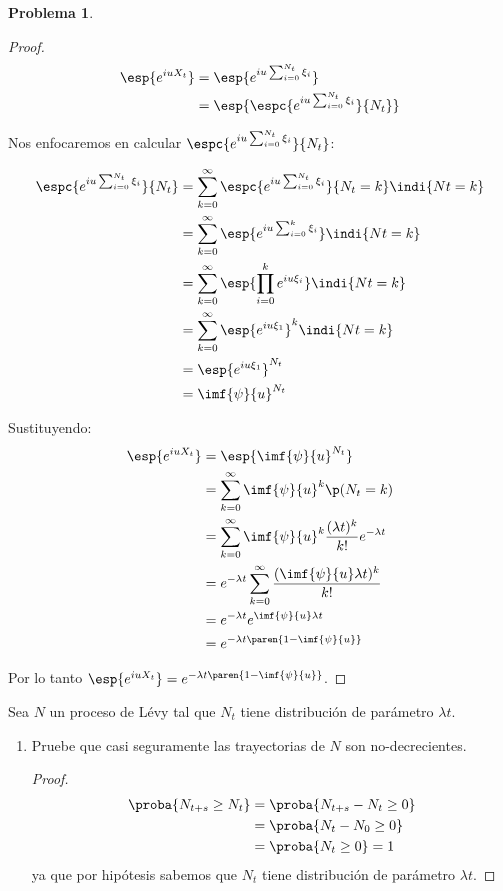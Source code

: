 \documentclass[a5paper,oneside]{amsart}
\theoremstyle{plain}
\theoremstyle{definition}
\newtheorem{problema}{Problema}
\begin{document}
\begin{problema}
\begin{proof}

\begin{align}
\esp{e^{iu X_t}}&=\esp{e^{iu \sum_{i=0}^{N_t}\xi_i}}\notag \\
&=\esp{\espc{e^{iu \sum_{i=0}^{N_t}\xi_i}}{N_t}}\notag
\end{align}

Nos enfocaremos en calcular $\espc{e^{iu \sum_{i=0}^{N_t}\xi_i}}{N_t}$:

\begin{align}
\espc{e^{iu \sum_{i=0}^{N_t}\xi_i}}{N_t}&=\sum_{k=0}^{\infty}\espc{e^{iu \sum_{i=0}^{N_t}\xi_i}}{N_t=k} \indi{Nt=k} \notag \\
&=\sum_{k=0}^{\infty}\esp{e^{iu \sum_{i=0}^{k}\xi_i}}\indi{Nt=k} \notag \\
&=\sum_{k=0}^{\infty}\esp{\prod_{i=0}^ke^{iu \xi_i}}\indi{Nt=k}\notag \\
&=\sum_{k=0}^{\infty}\esp{e^{iu \xi_1}}^k\indi{Nt=k} \notag  \\
&=\esp{e^{iu \xi_1}}^{N_t}\notag \\
&=\imf{\psi}{u}^{N_t}\notag
\end{align}

Sustituyendo:
\begin{align}
\esp{e^{iu X_t}} &=\esp{\imf{\psi}{u}^{N_t}}\notag \\
&=\sum_{k=0}^{\infty}\imf{\psi}{u}^k\p(N_t=k)\notag \\
&=\sum_{k=0}^{\infty}\imf{\psi}{u}^k\frac{(\lambda t)^{k}}{k!}e^{-\lambda t}\notag \\
&=e^{-\lambda t}\sum_{k=0}^{\infty}\frac{(\imf{\psi}{u} \lambda t)^{k}}{k!}\notag \\
&=e^{-\lambda t}e^{\imf{\psi}{u} \lambda t}\notag \\
&=e^{-\lambda t\paren{1-\imf{\psi}{u}}}\notag
\end{align}

Por lo  tanto $\esp{e^{iu X_t}}=e^{-\lambda t\paren{1-\imf{\psi}{u}}}$.
\end{proof}



Sea $N$ un proceso de L\'evy tal que $N_t$ tiene distribuci\'on de par\'ametro $\lambda t$. 
\begin{enumerate}
\item Pruebe que casi seguramente las trayectorias de $N$ son no-decrecientes.
\begin{proof}


\begin{align}
\proba{N_{t+s}\geq N_t}&=\proba{N_{t+s}-N_t\geq 0}\notag \\
&=\proba{N_{t}-N_0\geq 0}\notag \\
&=\proba{N_t\geq 0}=1 \notag
\end{align}
ya que por hip\'otesis sabemos que $N_t$ tiene distribuci\'on de par\'ametro $\lambda t$.


\end{proof}
\end{enumerate}
\end{problema}
\end{document}
